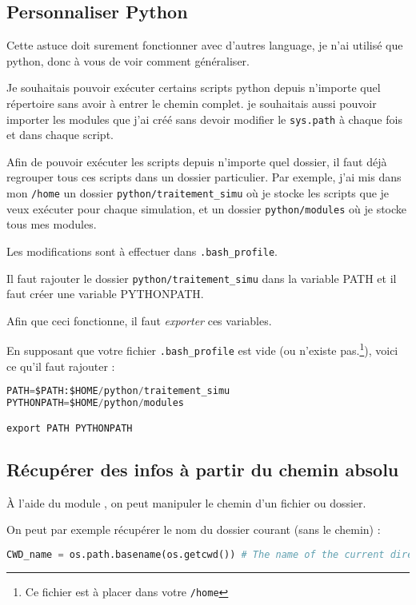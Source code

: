 \documentclass[a4paper,twoside]{article}
\begin{document}
\subsection{Personnaliser Python}
Cette astuce doit surement fonctionner avec d'autres language, je  n'ai utilisé que python, donc à vous de voir comment généraliser.

Je souhaitais pouvoir exécuter certains scripts python depuis  n'importe quel répertoire sans avoir à entrer le chemin complet. je  souhaitais aussi pouvoir importer les modules que j'ai créé sans  devoir modifier le \texttt{sys.path} à chaque fois et dans chaque  script.

Afin de pouvoir exécuter les scripts depuis n'importe quel dossier,  il faut déjà regrouper tous ces scripts dans un dossier particulier.  Par exemple, j'ai mis dans mon \texttt{/home} un dossier \texttt {python/traitement\_simu} où je stocke les scripts que je veux  exécuter pour chaque simulation, et un dossier \texttt{python/modules} où je stocke tous mes modules.

Les modifications sont à effectuer dans \texttt{.bash\_profile}.

Il faut rajouter le dossier \texttt{python/traitement\_simu} dans la  variable PATH et il faut créer une variable PYTHONPATH.

\begin{attention}
Afin que ceci fonctionne, il faut \emph{exporter} ces variables.
\end{attention}

En supposant que votre fichier \texttt{.bash\_profile} est vide (ou  n'existe pas.\footnote{Ce fichier est à placer dans votre \texttt{/home}}), voici ce qu'il faut rajouter :
\begin{lstlisting}[language=python]
PATH=$PATH:$HOME/python/traitement_simu
PYTHONPATH=$HOME/python/modules

export PATH PYTHONPATH
\end{lstlisting}

\subsection{Récupérer des infos à partir du chemin absolu}
À l'aide du module , on peut manipuler le chemin d'un fichier ou dossier. 

On peut par exemple récupérer le nom du dossier courant (sans le chemin) :
\begin{lstlisting}[language=python]
CWD_name = os.path.basename(os.getcwd()) # The name of the current directory
\end{lstlisting}
\end{document}
